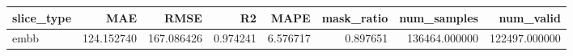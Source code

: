 \begin{tabular}{lrrrrrrr}
\toprule
slice_type & MAE & RMSE & R2 & MAPE & mask_ratio & num_samples & num_valid \\
\midrule
embb & 124.152740 & 167.086426 & 0.974241 & 6.576717 & 0.897651 & 136464.000000 & 122497.000000 \\
\bottomrule
\end{tabular}
